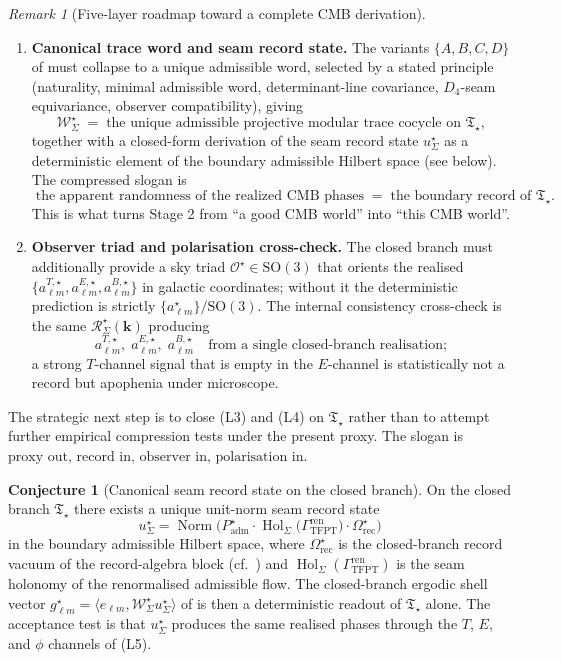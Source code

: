 \documentclass[11pt,a4paper]{article}
\theoremstyle{definition}
\newtheorem{conjecture}[theorem]{Conjecture}
\theoremstyle{remark}
\newtheorem*{remark}{Remark}
\newcommand{\Padm}{P_{\mathrm{adm}}}
\newcommand{\Tstar}{\mathfrak T_{\star}}
\begin{document}
\begin{remark}[Five-layer roadmap toward a complete CMB derivation]
\begin{enumerate}[label=(L\arabic*),leftmargin=2.4em,topsep=3pt,itemsep=2pt]
\item \textbf{Canonical trace word and seam record state.} The variants $\{A,B,C,D\}$ of
 must collapse to a unique admissible word, selected by a stated
principle (naturality, minimal admissible word, determinant-line covariance,
$D_4$-seam equivariance, observer compatibility), giving
\[
\mathcal W_\Sigma^\star\;=\;\text{the unique admissible projective modular trace cocycle on }\Tstar,
\]
together with a closed-form derivation of the seam record state $u_\Sigma^\star$ as a
deterministic element of the boundary admissible Hilbert space (see
 below). The compressed slogan is
\[
\boxed{\;\text{the apparent randomness of the realized CMB phases}\;=\;\text{the boundary record of }\Tstar.\;}
\]
This is what turns Stage 2 from ``a good CMB world'' into ``this CMB world''.

\item \textbf{Observer triad and polarisation cross-check.} The closed branch must additionally
provide a sky triad $\mathcal O^\star\in\mathrm{SO}(3)$ that orients the realised
$\{a_{\ell m}^{T,\star},a_{\ell m}^{E,\star},a_{\ell m}^{B,\star}\}$ in galactic coordinates;
without it the deterministic prediction is strictly $\{a_{\ell m}^\star\}/\mathrm{SO}(3)$. The
internal consistency cross-check is the same $\mathcal R_\Sigma^\star(\mathbf k)$ producing
\[
a_{\ell m}^{T,\star},\;
a_{\ell m}^{E,\star},\;
a_{\ell m}^{B,\star}
\quad\text{from a single closed-branch realisation};
\]
a strong $T$-channel signal that is empty in the $E$-channel is statistically not a record but
apophenia under microscope.
\end{enumerate}
The strategic next step is to close (L3) and (L4) on $\Tstar$ rather than to attempt further
empirical compression tests under the present proxy. The slogan is
\(\text{proxy out, record in, observer in, polarisation in.}\)
\end{remark}

\begin{conjecture}[Canonical seam record state on the closed branch]
\label{conj:seam-record-state}
On the closed branch $\Tstar$ there exists a unique unit-norm seam record state
\[
u_\Sigma^\star
=
\operatorname{Norm}\bigl(
\Padm^\star\cdot
\operatorname{Hol}_\Sigma\bigl(\Gamma_{\mathrm{TFPT}}^{\mathrm{ren}}\bigr)\cdot
\Omega_{\mathrm{rec}}^\star
\bigr)
\]
in the boundary admissible Hilbert space, where $\Omega_{\mathrm{rec}}^\star$ is the closed-branch
record vacuum of the record-algebra block (cf.\ ) and
$\operatorname{Hol}_\Sigma(\Gamma_{\mathrm{TFPT}}^{\mathrm{ren}})$ is the seam holonomy of the
renormalised admissible flow. The closed-branch ergodic shell vector
$g_{\ell m}^\star=\langle e_{\ell m},\mathcal W_\Sigma^\star u_\Sigma^\star\rangle$ of
 is then a deterministic readout of $\Tstar$ alone.
The acceptance test is that $u_\Sigma^\star$ produces the same realised phases through the
$T$, $E$, and $\phi$ channels of (L5).
\end{conjecture}
\end{document}
